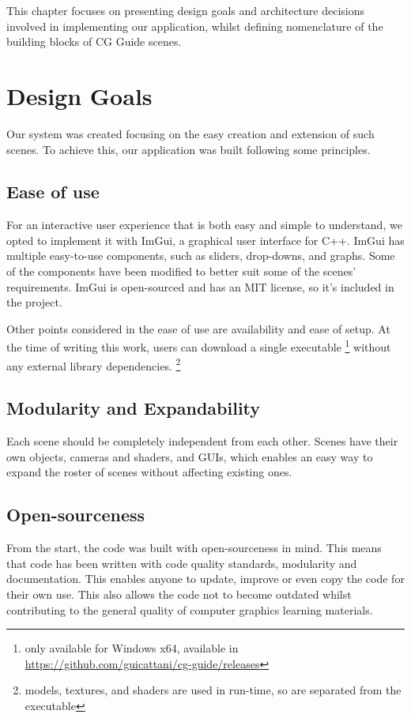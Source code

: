 \documentclass[cic,tc,english]{iiufrgs}
\begin{document}
This chapter focuses on presenting design goals and architecture decisions involved in implementing our application, whilst defining nomenclature of the building blocks of CG Guide scenes.
\section{Design Goals}
Our system was created focusing on the easy creation and extension of such scenes. To achieve this, our application was built following some principles.

\subsection{Ease of use}
For an interactive user experience that is both easy and simple to understand, we opted to implement it with ImGui, a graphical user interface for C++. ImGui has multiple easy-to-use components, such as sliders, drop-downs, and graphs. Some of the components have been modified to better suit some of the scenes' requirements. ImGui is open-sourced and has an MIT license, so it's included in the project.

Other points considered in the ease of use are availability and ease of setup. At the time of writing this work, users can download a single executable \footnote{only available for Windows x64, available in \href{https://github.com/guicattani/cg-guide/releases}{https://github.com/guicattani/cg-guide/releases}} without any external library dependencies.
\footnote{models, textures, and shaders are used in run-time, so are separated from the executable}

\subsection{Modularity and Expandability}
Each scene should be completely independent from each other. Scenes have their own objects, cameras and shaders, and GUIs, which enables an easy way to expand the roster of scenes without affecting existing ones.

\subsection{Open-sourceness}
From the start, the code was built with open-sourceness in mind. This means that code has been written with code quality standards, modularity and documentation. This enables anyone to update, improve or even copy the code for their own use. This also allows the code not to become outdated whilst contributing to the general quality of computer graphics learning materials.
\end{document}
